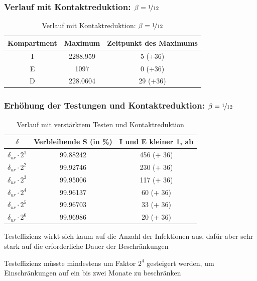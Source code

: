 \documentclass{beamer}
\begin{document}
\begin{frame}
	\frametitle{Verlauf mit Kontaktreduktion: $\beta = \nicefrac{1}{12}$}
	\begin{table}[h]
		\caption{Verlauf mit Kontaktreduktion: $\beta = \nicefrac{1}{12}$}
		\centering
		\begin{tabular}{@{}ccc@{}}
			\toprule
			Kompartment & Maximum & Zeitpunkt des Maximums\\ 
			\midrule
			I & 2288.959 & 5 (+36)\\ 
			E & 1097 & 0 (+36)\\ 
			D & 228.0604 &  29 (+36)\\ 
			\bottomrule
		\end{tabular}
	\end{table}
\end{frame}

\begin{frame}
	\frametitle{Erhöhung der Testungen und Kontaktreduktion: $\beta = \nicefrac{1}{12}$}
	\begin{table}[h]
		\caption{Verlauf mit verstärktem Testen und Kontaktreduktion}
		\centering
		\begin{tabular}{@{}ccc@{}}
			\toprule
			$\delta$ & Verbleibende S (in \%) & I und E kleiner 1, ab\\ 
			\midrule
			 $\delta_{ur} \cdot 2^1$ & 99.88242 & 456 (+ 36) \\ 
			 $\delta_{ur} \cdot 2^2$ & 99.92746 & 230 (+ 36)\\  
			 $\delta_{ur} \cdot 2^3$ & 99.95006 & 117 (+ 36) \\ 
			 $\delta_{ur} \cdot 2^4$ & 99.96137 & 60 (+ 36)\\ 
			 $\delta_{ur} \cdot 2^5$ & 99.96703 & 33 (+ 36)\\ 
			 $\delta_{ur} \cdot 2^6$ & 99.96986 & 20 (+ 36)\\ 
			\bottomrule
		\end{tabular}
	\end{table}
	\begin{arrowlist}
		\item Testeffizienz wirkt sich kaum auf die Anzahl der Infektionen aus, dafür aber sehr stark auf die erforderliche Dauer der Beschränkungen
		\item Testeffizienz müsste mindestens um Faktor $2^4$ gesteigert werden, um Einschränkungen auf ein bis zwei Monate zu beschränken
	\end{arrowlist}
\end{frame}
\end{document}
